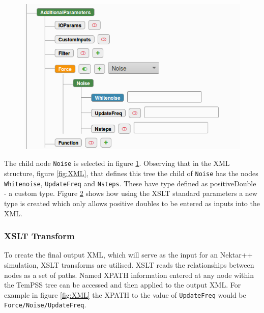 \documentclass[11pt, a4paper]{report}
\begin{document}
\begin{figure}[htb!]
 \centering
 \includegraphics[width=.75\linewidth,  clip=true, trim = 0cm 0cm 0cm 0cm]{force_tree}
 \label{fig:force_tree}
\end{figure}

The child node \texttt{Noise} is selected in figure \ref{fig:force_tree}. Observing that in the XML structure, figure \ref{fig:XML}, that defines this tree the child of \texttt{Noise} has the nodes \texttt{Whitenoise}, \texttt{UpdateFreq} and \texttt{Nsteps}. These have type defined as positiveDouble - a custom type. Figure \ref{fig:custom_type} shows how using the XSLT standard parameters a new type is created which only allows positive doubles to be entered as inputs into the XML.

\begin{figure}[htb!]
 \centering
 
 \label{fig:custom_type}
\end{figure}

\subsubsection{XSLT Transform}
To create the final output XML, which will serve as the input for an Nektar++ simulation, XSLT transforms are utilised. XSLT reads the relationships between nodes as a set of paths. Named XPATH information entered at any node within the TemPSS tree can be accessed and then applied to the output XML. For example in figure \ref{fig:XML} the XPATH to the value of \texttt{UpdateFreq} would be \texttt{Force/Noise/UpdateFreq}.

\begin{figure}[htb!]
 \centering
 
 \label{fig:xsl_parent}
\end{figure}
\end{document}
